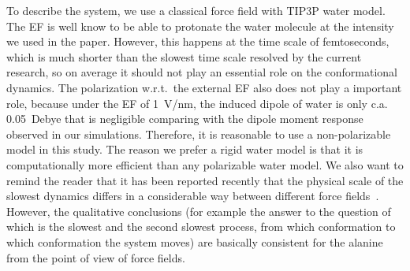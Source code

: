 \documentclass[a4paper,preprint,unsortedaddress,onecolumn]{revtex4-1}
\begin{document}
To describe the system, we use a classical force field with TIP3P water model.
The EF is well know to be able to protonate the water molecule at the
intensity we used in the paper. However, this happens at the time
scale of femtoseconds, which is much shorter than the slowest time
scale resolved by the current research, so on average it should not play an essential role on the conformational dynamics.
The polarization w.r.t.~the external EF also does
not play a important role, because  under the EF of 1~V/nm, the induced dipole
of water is only c.a. 0.05~Debye that is negligible comparing with the
dipole moment response observed in our simulations.  Therefore, it is
reasonable to use a non-polarizable model in this study.  The reason we
prefer a rigid water model is that it is computationally more
efficient than any polarizable water model.  We also want to remind
the reader that it has been reported recently that the physical scale of the slowest
dynamics differs in a considerable way between different force
fields~\cite{vitalini2013speed}. However, the qualitative conclusions (for
example the answer to the question of which is the slowest and the second slowest process, from which
conformation to which conformation the system moves) are basically consistent for the alanine from the point of view of force fields.



{}

\end{document}
